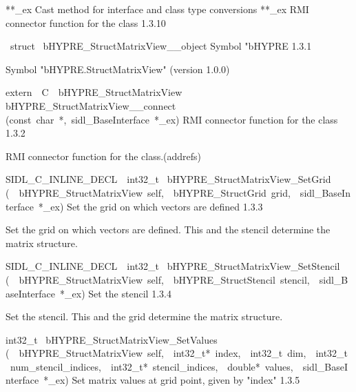 \documentclass{article}
\begin{document}
\begin{cxxentry}
\begin{cxxentry}
\begin{cxxnames}
        {**\_ex}
        {}
        {
Cast method for interface and class type conversions}
        {}
\label{cxx.1.3.19}
        {**\_ex}
        {}
        {
RMI connector function for the class}
        {1.3.10}
\end{cxxnames}
\begin{cxxvariable}
{\ struct\ }
        {bHYPRE\_StructMatrixView\_\_object}
        {}
        {
Symbol "bHYPRE}
        {1.3.1}
\begin{cxxdoc}

Symbol "bHYPRE.StructMatrixView" (version 1.0.0)
\end{cxxdoc}
\end{cxxvariable}
\begin{cxxfunction}
{extern\ \ C\ \ bHYPRE\_StructMatrixView\ }
        {bHYPRE\_StructMatrixView\_\_connect}
        {(const\ char\ *,\ sidl\_BaseInterface\ *\_ex)}
        {
RMI connector function for the class}
        {1.3.2}
\begin{cxxdoc}

RMI connector function for the class.(addrefs)
\end{cxxdoc}
\end{cxxfunction}
\begin{cxxfunction}
{SIDL\_C\_INLINE\_DECL\ \ int32\_t\ }
        {bHYPRE\_StructMatrixView\_SetGrid}
        {(\ \ bHYPRE\_StructMatrixView\ self,\ \ bHYPRE\_StructGrid\ grid,\ \ sidl\_BaseInterface\ *\_ex)}
        {
Set the grid on which vectors are defined}
        {1.3.3}
\begin{cxxdoc}

Set the grid on which vectors are defined.  This and the stencil
determine the matrix structure. 
\end{cxxdoc}
\end{cxxfunction}
\begin{cxxfunction}
{SIDL\_C\_INLINE\_DECL\ \ int32\_t\ }
        {bHYPRE\_StructMatrixView\_SetStencil}
        {(\ \ bHYPRE\_StructMatrixView\ self,\ \ bHYPRE\_StructStencil\ stencil,\ \ sidl\_BaseInterface\ *\_ex)}
        {
Set the stencil}
        {1.3.4}
\begin{cxxdoc}

Set the stencil. This and the grid determine the matrix structure. 
\end{cxxdoc}
\end{cxxfunction}
\begin{cxxfunction}
{int32\_t\ }
        {bHYPRE\_StructMatrixView\_SetValues}
        {(\ \ bHYPRE\_StructMatrixView\ self,\ \ int32\_t*\ index,\ \ int32\_t\ dim,\ \ int32\_t\ num\_stencil\_indices,\ \ int32\_t*\ stencil\_indices,\ \ double*\ values,\ \ sidl\_BaseInterface\ *\_ex)}
        {
Set matrix values at grid point, given by "index"}
        {1.3.5}
\begin{cxxdoc}


\end{cxxdoc}
\end{cxxfunction}
\end{cxxentry}
\end{cxxentry}
\end{document}
